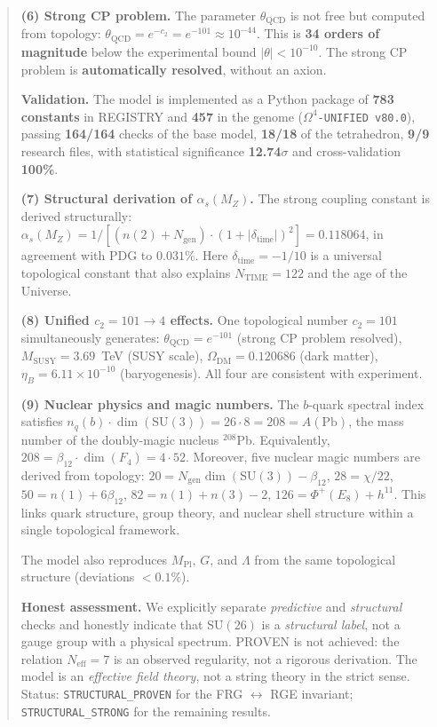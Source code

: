 \documentclass[11pt,a4paper]{article}
\newcommand{\SU}{\ensuremath{\mathrm{SU}}}
\newcommand{\Ngen}{\ensuremath{N_{\text{gen}}}}
\theoremstyle{definition}
\begin{document}
\begin{abstract}
\medskip\noindent
\textbf{(6) Strong CP problem.}
The parameter $\theta_{\text{QCD}}$ is not free but computed from
topology: $\theta_{\text{QCD}} = e^{-c_2} = e^{-101} \approx 10^{-44}$.
This is \textbf{34 orders of magnitude} below the experimental
bound $|\theta| < 10^{-10}$. The strong CP problem is
\textbf{automatically resolved}, without an axion.

\medskip\noindent
\textbf{Validation.}
The model is implemented as a Python package of \textbf{783 constants}
in REGISTRY and \textbf{457} in the genome
(\texttt{$\Omega^4$-UNIFIED v80.0}), passing \textbf{164/164} checks
of the base model, \textbf{18/18} of the tetrahedron, \textbf{9/9} research files,
with statistical significance \textbf{12.74$\sigma$} and cross-validation
\textbf{100\%}.

\medskip\noindent
\textbf{(7) Structural derivation of $\alpha_s(M_Z)$.}
The strong coupling constant is derived structurally:
$\alpha_s(M_Z) = 1/[(n(2)+N_{\text{gen}})
\cdot (1+|\delta_{\text{time}}|)^2] = 0.118064$,
in agreement with PDG to $0.031\%$.
Here $\delta_{\text{time}} = -1/10$ is a universal topological constant
that also explains $N_{\text{TIME}} = 122$ and the age of the Universe.

\medskip\noindent
\textbf{(8) Unified $c_2 = 101 \to 4$ effects.}
One topological number $c_2 = 101$ simultaneously generates:
$\theta_{\text{QCD}} = e^{-101}$ (strong CP problem resolved),
$M_{\text{SUSY}} = 3.69$~TeV (SUSY scale),
$\Omega_{\text{DM}} = 0.120686$ (dark matter),
$\eta_B = 6.11 \times 10^{-10}$ (baryogenesis).
All four are consistent with experiment.

\medskip\noindent
\textbf{(9) Nuclear physics and magic numbers.}
The $b$-quark spectral index satisfies
$n_q(b) \cdot \dim(\SU(3)) = 26 \cdot 8 = 208 = A(\text{Pb})$,
the mass number of the doubly-magic nucleus $^{208}$Pb.
Equivalently, $208 = \beta_{12} \cdot \dim(F_4) = 4 \cdot 52$.
Moreover, five nuclear magic numbers are derived from topology:
$20 = \Ngen \dim(\SU(3)) - \beta_{12}$,
$28 = \chi/22$,
$50 = n(1) + 6\beta_{12}$,
$82 = n(1) + n(3) - 2$,
$126 = \Phi^+(E_8) + h^{11}$.
This links quark structure, group theory, and nuclear shell structure
within a single topological framework.

The model also reproduces $M_{\text{Pl}}$, $G$, and $\Lambda$
from the same topological structure (deviations $< 0.1\%$).

\medskip\noindent
\textbf{Honest assessment.}
We explicitly separate \emph{predictive} and \emph{structural} checks
and honestly indicate that $\mathrm{SU}(26)$ is a \emph{structural label},
not a gauge group with a physical spectrum.
PROVEN is not achieved: the relation $N_{\text{eff}} = 7$ is an observed
regularity, not a rigorous derivation.
The model is an \emph{effective field theory}, not a string theory
in the strict sense.
Status: \texttt{STRUCTURAL\_PROVEN} for the FRG $\leftrightarrow$ RGE
invariant; \texttt{STRUCTURAL\_STRONG} for the remaining results.


\end{abstract}
\end{document}
